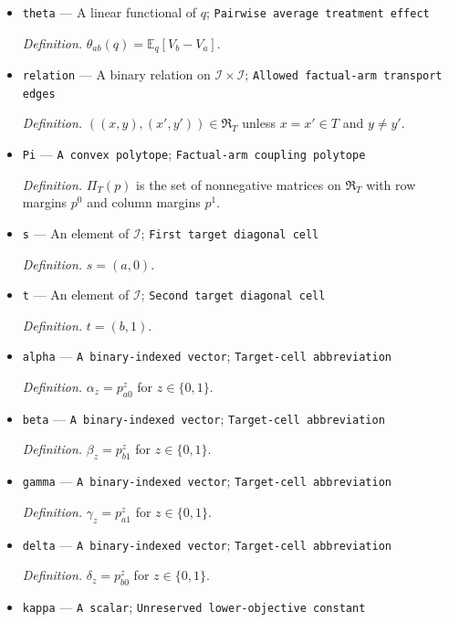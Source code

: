 \documentclass{article}
\begin{document}
\begin{itemize}
  \item \texttt{theta} --- A linear functional of \(q\); \texttt{Pairwise average treatment effect}
  \par\smallskip\noindent\emph{Definition.} \(\theta_{ab}(q)=\mathbb E_q[V_b-V_a]\).
  \item \texttt{relation} --- A binary relation on \(\mathcal I\times\mathcal I\); \texttt{Allowed factual-\allowbreak{}arm transport edges}
  \par\smallskip\noindent\emph{Definition.} \(((x,y),(x',y'))\in\mathfrak R_T\) unless \(x=x'\in T\) and \(y\neq y'\).
  \item \texttt{Pi} --- \texttt{A convex polytope}; \texttt{Factual-\allowbreak{}arm coupling polytope}
  \par\smallskip\noindent\emph{Definition.} \(\Pi_T(p)\) is the set of nonnegative matrices on \(\mathfrak R_T\) with row margins \(p^0\) and column margins \(p^1\).
  \item \texttt{s} --- An element of \(\mathcal I\); \texttt{First target diagonal cell}
  \par\smallskip\noindent\emph{Definition.} \(s=(a,0)\).
  \item \texttt{t} --- An element of \(\mathcal I\); \texttt{Second target diagonal cell}
  \par\smallskip\noindent\emph{Definition.} \(t=(b,1)\).
  \item \texttt{alpha} --- \texttt{A binary-\allowbreak{}indexed vector}; \texttt{Target-\allowbreak{}cell abbreviation}
  \par\smallskip\noindent\emph{Definition.} \(\alpha_z=p^z_{a0}\) for \(z\in\{0,1\}\).
  \item \texttt{beta} --- \texttt{A binary-\allowbreak{}indexed vector}; \texttt{Target-\allowbreak{}cell abbreviation}
  \par\smallskip\noindent\emph{Definition.} \(\beta_z=p^z_{b1}\) for \(z\in\{0,1\}\).
  \item \texttt{gamma} --- \texttt{A binary-\allowbreak{}indexed vector}; \texttt{Target-\allowbreak{}cell abbreviation}
  \par\smallskip\noindent\emph{Definition.} \(\gamma_z=p^z_{a1}\) for \(z\in\{0,1\}\).
  \item \texttt{delta} --- \texttt{A binary-\allowbreak{}indexed vector}; \texttt{Target-\allowbreak{}cell abbreviation}
  \par\smallskip\noindent\emph{Definition.} \(\delta_z=p^z_{b0}\) for \(z\in\{0,1\}\).
  \item \texttt{kappa} --- \texttt{A scalar}; \texttt{Unreserved lower-\allowbreak{}objective constant}

\end{itemize}
\end{document}
